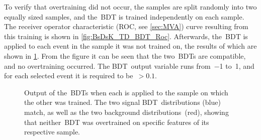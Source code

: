 To verify that overtraining did not occur, the samples are split randomly into two equally sized samples, and the~BDT is trained independently on each sample.
The receiver operator characteristic (ROC, see \cref{sec:MVA}) curve resulting from this training is shown in \cref{fig:BsDsK_TD_BDT_Roc}.
Afterwards, the~BDT is applied to each event in the sample it was not trained on, the results of which are shown in \cref{fig:BsDsK_TD_BDTResponse}.
From the figure it can be seen that the two~BDTs are compatible, and no overtraining occurred.
The BDT~output variable runs from~\num{-1} to~\num{1}, and for each selected event it is required to be~\({> \num{0.1}}\).
%
\begin{figure}[htb] \centerfloat
    \caption{
        Output of the~BDTs when each is applied to the sample on which the other was trained.
        The two signal BDT~distributions (blue) match, as well as the two background distributions~(red), showing that neither~BDT was overtrained on specific features of its respective sample.}
    \label{fig:BsDsK_TD_BDTResponse}
\end{figure}

